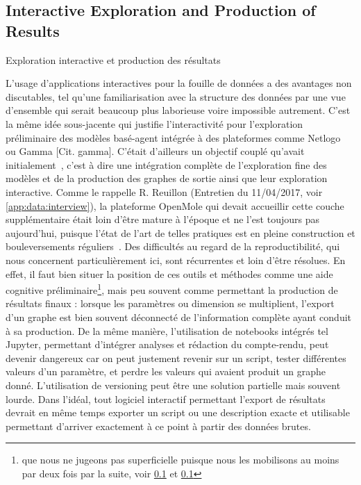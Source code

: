 \subsection{Interactive Exploration and Production of Results}{Exploration interactive et production des résultats}

L'usage d'applications interactives pour la fouille de données a des avantages non discutables, tel qu'une familiarisation avec la structure des données par une vue d'ensemble qui serait beaucoup plus laborieuse voire impossible autrement. C'est la même idée sous-jacente qui justifie l'interactivité pour l'exploration préliminaire des modèles basé-agent intégrée à des plateformes comme Netlogo~\cite{wilensky1999netlogo} ou Gamma [Cit. gamma]. C'était d'ailleurs un objectif couplé qu'avait initialement~\cite{rey2015plateforme}, c'est à dire une intégration complète de l'exploration fine des modèles et de la production des graphes de sortie ainsi que leur exploration interactive. Comme le rappelle R. Reuillon (Entretien du 11/04/2017, voir \ref{app:data:interview}), la plateforme OpenMole qui devait accueillir cette couche supplémentaire était loin d'être mature à l'époque et ne l'est toujours pas aujourd'hui, puisque l'état de l'art de telles pratiques est en pleine construction et bouleversements réguliers~\cite{holzinger2014knowledge}. Des difficultés au regard de la reproductibilité, qui nous concernent particulièrement ici, sont récurrentes et loin d'être résolues. En effet, il faut bien situer la position de ces outils et méthodes comme une aide cognitive préliminaire\footnote{que nous ne jugeons pas superficielle puisque nous les mobilisons au moins par deux fois par la suite, voir \ref{} et \ref{}}, mais peu souvent comme permettant la production de résultats finaux : lorsque les paramètres ou dimension se multiplient, l'export d'un graphe est bien souvent déconnecté de l'information complète ayant conduit à sa production. De la même manière, l'utilisation de notebooks intégrés tel Jupyter, permettant d'intégrer analyses et rédaction du compte-rendu, peut devenir dangereux car on peut justement revenir sur un script, tester différentes valeurs d'un paramètre, et perdre les valeurs qui avaient produit un graphe donné. L'utilisation de versioning peut être une solution partielle mais souvent lourde. Dans l'idéal, tout logiciel interactif permettant l'export de résultats devrait en même temps exporter un script ou une description exacte et utilisable permettant d'arriver exactement à ce point à partir des données brutes.








